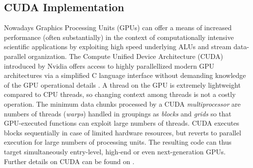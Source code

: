 \documentclass[1p,times]{elsarticle}
\begin{document}
\subsection{CUDA Implementation}
\label{cuda}
Nowadays Graphics Processing Units (GPUs) can offer a means of increased performance 
(often substantially) in the context of computationally intensive scientific applications by exploiting high speed underlying ALUs and stream data-parallel organization. 
The Compute Unified Device Architecture (CUDA) introduced by Nvidia offers access to highly parallellized modern GPU architectures via a 
simplified C language interface without demanding knowledge of the 
GPU operational details \cite{cuda}.
A thread on the GPU is extremely lightweight compared to CPU threads, so changing context among threads is not a costly operation. The minimum 
data chunks processed by a CUDA {\it multiprocessor} are numbers of threads ({\it warps}) handled in groupings as {\it blocks} and {\it grids} so that GPU-executed functions can exploit large numbers of threads. CUDA executes blocks sequentially
in case of limited hardware resources, but reverts to parallel execution for large numbers 
of processing units.  The resulting code can thus target simultaneously entry-level, high-end or even next-generation GPUs. Further details on CUDA can be found on \cite{cudaprogguide}.

\end{document}
